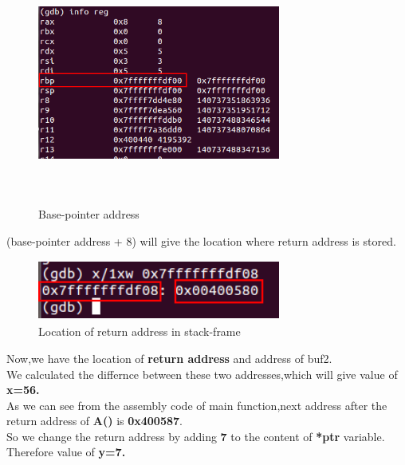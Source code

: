 \documentclass{article}
\begin{document}
         \begin{figure}[H]
          \begin{center}
		\includegraphics[width=8cm,height=8cm]{reg.png}
	\caption{Base-pointer address}
	\end{center}
	\end{figure}
         
         (base-pointer address + 8) will give the location where return address is stored.\\
          
           \begin{figure}[H]
             \begin{center}
		\includegraphics[width=8cm,height=2cm]{ret.png}
	\caption{Location of return address in stack-frame}
	\end{center}
	\end{figure}
         
         Now,we have the location of \textbf{return address} and address of buf2.\\
         We calculated the differnce between these two
         addresses,which will give value of \textbf{x=56.}\\
         As we can see from the assembly code of main function,next address after the return address of \textbf{A()} is \textbf{0x400587}.\\
          So we change the return address by adding \textbf{7} to the content of \textbf{*ptr} variable.\\
          Therefore value of \textbf{y=7.}\\
          
\end{document}
